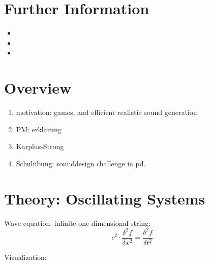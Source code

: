 \section{Further Information}

\begin{itemize}
  \item {}
  \item {}
  \item {}
\end{itemize}



\section{Overview}


\begin{enumerate}
	\item motivation: games, and efficient realistic sound generation
	\item PM: erklärung
	\item Karplus-Strong
	\item Schulübung: sounddesign challenge in pd.

\end{enumerate}

\section{Theory: Oscillating Systems}


Wave equation, infinite one-dimensional string:
\begin{equation}
	c^2 \cdot \frac{\delta^2 f}{\delta x^2} = \frac{\delta ^2 f}{\delta t ^2}
\end{equation}

Visualization:


